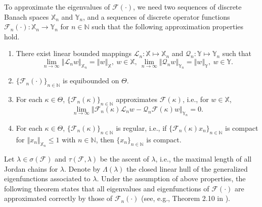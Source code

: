 \documentclass{article}
\newcommand{\norm}[1]{\left\Vert#1\right\Vert}
\begin{document}
	To approximate the eigenvalues of $\mathcal{F}(\cdot)$, we need two sequences of discrete Banach spaces $\mathbb{X}_n$ and  $\mathbb{Y}_n$, and a sequences of discrete operator functions $\mathcal{F}_n(\cdot): \mathbb{X}_n \to \mathbb{Y}_n$ for $n\in\mathbb{N}$ such that the following approximation properties hold.
	\begin{enumerate}
		\item[\rm(A1)] { There exist linear bounded mappings $\mathcal{L}_n:\mathbb{X}\mapsto\mathbb{X}_n$  and $\mathcal{Q}_n:\mathbb{Y}\mapsto\mathbb{Y}_n$ such that
			\begin{equation*}
				\lim_{n\to\infty}\norm{\mathcal{L}_nw}_{\mathbb{X}_n}=\norm{w}_{\mathbb{X}},~w\in\mathbb{X},~\lim_{n\to\infty}\norm{\mathcal{Q}_nw}_{\mathbb{Y}_n}=\norm{w}_{\mathbb{Y}},~w\in\mathbb{Y}.
		\end{equation*} }
		\item[\rm(A2)] { $\{\mathcal{F}_n(\cdot)\}_{n\in\mathbb{N}}$ is equibounded on $\Theta$.}
		\item[\rm(A3)] { For each $\kappa\in\Theta$, $\{\mathcal{F}_n(\kappa)\}_{n\in\mathbb{N}}$ approximates $\mathcal{F}(\kappa)$, i.e., for $w\in\mathbb{X}$,
			\begin{equation*}
				\lim_{n\to\infty}\norm{\mathcal{F}_n(\kappa)\mathcal{L}_nw-\mathcal{Q}_n\mathcal{F}(\kappa)w}_{\mathbb{Y}_n}=0.
		\end{equation*}}
		\item[\rm(A4)] { For each $\kappa\in\Theta$, $\{\mathcal{F}_n(\kappa)\}_{n\in\mathbb{N}}$ is regular, i.e.,  if $\{\mathcal{F}_n(\kappa)x_n\}_{n\in\mathbb{N}}$ is compact for $\norm{x_n}_{\mathbb{X}_n}\leq1$ with $n\in\mathbb{N}$, then $\{x_n\}_{n\in\mathbb{N}}$ is compact.}
	\end{enumerate}
	
	Let $\lambda\in\sigma(\mathcal{F})$ and $\tau(\mathcal{F},\lambda)$ be the ascent of $\lambda$, i.e., the maximal length of all Jordan chains for $\lambda$. Denote by $\Lambda(\lambda)$ the closed linear hull of the generalized eigenfunctions associated to $\lambda$. Under the assumption of above properties, the following theorem states that all eigenvalues and eigenfunctions of $\mathcal{F}(\cdot)$ are approximated correctly by those of $\mathcal{F}_n(\cdot)$ (see, e.g., Theorem 2.10 in \cite{Beyn2014}).
	
\end{document}
